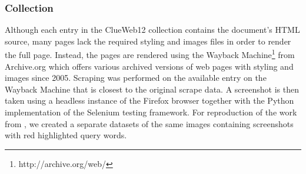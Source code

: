 \subsubsection{Collection}
Although each entry in the ClueWeb12 collection contains the document's HTML source, many pages lack the required styling and images files in order to render the full page. Instead, the pages are rendered using the Wayback Machine\footnote{http://archive.org/web/} from Archive.org which offers various archived versions of web pages with styling and images since 2005. Scraping was performed on the available entry on the Wayback Machine that is closest to the original scrape data. A screenshot is then taken using a headless instance of the Firefox browser together with the Python implementation of the Selenium testing framework. 
For reproduction of the work from \citet{fan2017learning}, we created a separate datasets of the same images containing screenshots with red highlighted query words. 

